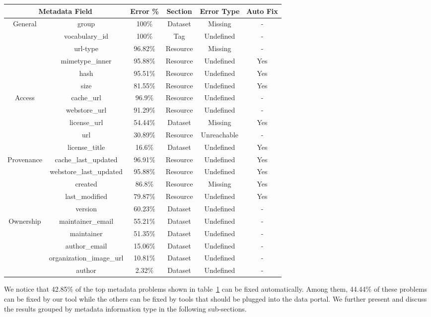 \documentclass[runningheads,a4paper]{../../Tools/LaTEX/llncs}
\begin{document}
\begin{table}
\begin{center}
\begin{tabular}{|c|c|c|c|c|c|}
\hline
\multicolumn{2}{|c|}{Metadata Field} & Error \% & Section & Error Type & Auto Fix\tabularnewline
\hline
\hline
\multirow{6}{*}{General } & group & 100\% & Dataset & Missing & -\tabularnewline
\cline{2-6}
 & vocabulary\_id & 100\% & Tag & Undefined & -\tabularnewline
\cline{2-6}
 & url-type & 96.82\% & Resource & Missing & -\tabularnewline
\cline{2-6}
 & mimetype\_inner & 95.88\% & Resource & Undefined & Yes\tabularnewline
\cline{2-6}
 & hash & 95.51\% & Resource & Undefined & Yes\tabularnewline
\cline{2-6}
 & size & 81.55\% & Resource & Undefined & Yes\tabularnewline
\hline
\multirow{5}{*}{Access } & cache\_url & 96.9\% & Resource & Undefined & -\tabularnewline
\cline{2-6}
 & webstore\_url & 91.29\% & Resource & Undefined & -\tabularnewline
\cline{2-6}
 & license\_url & 54.44\% & Dataset & Missing & Yes\tabularnewline
\cline{2-6}
 & url & 30.89\% & Resource & Unreachable & -\tabularnewline
\cline{2-6}
 & license\_title & 16.6\% & Dataset & Undefined & Yes\tabularnewline
\hline
\multirow{5}{*}{Provenance } & cache\_last\_updated & 96.91\% & Resource & Undefined & Yes\tabularnewline
\cline{2-6}
 & webstore\_last\_updated & 95.88\% & Resource & Undefined & Yes\tabularnewline
\cline{2-6}
 & created & 86.8\% & Resource & Missing & Yes\tabularnewline
\cline{2-6}
 & last\_modified & 79.87\% & Resource & Undefined & Yes\tabularnewline
\cline{2-6}
 & version & 60.23\% & Dataset & Undefined & -\tabularnewline
\hline
\multirow{5}{*}{Ownership } & maintainer\_email & 55.21\% & Dataset & Undefined & -\tabularnewline
\cline{2-6}
 & maintainer & 51.35\% & Dataset & Undefined & -\tabularnewline
\cline{2-6}
 & author\_email & 15.06\% & Dataset & Undefined & -\tabularnewline
\cline{2-6}
 & organization\_image\_url & 10.81\% & Dataset & Undefined & -\tabularnewline
\cline{2-6}
 & author & 2.32\% & Dataset & Undefined & -\tabularnewline
\hline
\end{tabular}
\label{tab:top_metadata_fields_errors}
\end{center}
\end{table}

We notice that 42.85\% of the top metadata problems shown in table~\ref{tab:top_metadata_fields_errors} can be fixed automatically. Among them, 44.44\% of these problems can be fixed by our tool while the others can be fixed by tools that should  be plugged into the data portal. We further present and discuss the results grouped by metadata information type in the following sub-sections.
\end{document}
